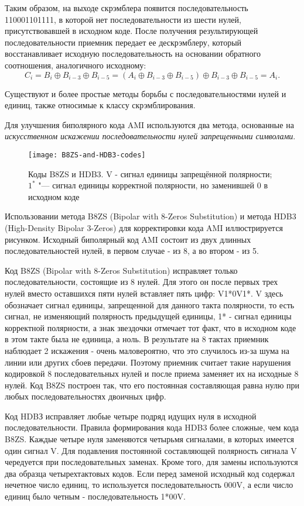 Таким образом, на выходе скрэмблера появится последовательность 110001101111, в которой нет последовательности из шести нулей, присутствовавшей в исходном коде.
После получения результирующей последовательности приемник передает ее дескрэмблеру, который восстанавливает исходную последовательность на основании обратного соотношения, аналогичного исходному:
\[
    C_i = B_i \oplus B_{i-3} \oplus B_{i-5} = (A_i \oplus B_{i-3} \oplus B_{i-5}) \oplus B_{i-3} \oplus B_{i-5} = A_i.
\]

Существуют и более простые методы борьбы с последовательностями нулей и единиц, также относимые к классу скрэмблирования.

Для улучшения биполярного кода AMI используются два метода, основанные на \emph{искусственном искажении последовательности нулей запрещенными символами}.

\begin{figure}[!ht]
    \centering
    \texttt{[image: B8ZS-and-HDB3-codes]}
    \caption{Коды B8ZS и HDB3. V - сигнал единицы запрещённой полярности; $1^*$ "--- сигнал единицы корректной полярности, но заменившей 0 в исходном коде}
    \label{fig:B8ZS-and-HDB3-codes}
\end{figure}

Использовании метода B8ZS (Bipolar with 8-Zeros Substitution) и метода HDB3 (High-Density Bipolar 3-Zeros) для корректировки кода AMI иллюстрируется рисунком.
Исходный биполярный код AMI состоит из двух длинных последовательностей нулей, в первом случае - из 8, а во втором - из 5.

Код B8ZS (Bipolar with 8-Zeros Substitution) исправляет только последовательности, состоящие из 8 нулей.
Для этого он после первых трех нулей вместо оставшихся пяти нулей вставляет пять цифр: V1*0V1*.
V здесь обозначает сигнал единицы, запрещенной для данного такта полярности, то есть сигнал, не изменяющий полярность предыдущей единицы, 1* - сигнал единицы корректной полярности, а знак звездочки отмечает тот факт, что в исходном коде в этом такте была не единица, а ноль.
В результате на 8 тактах приемник наблюдает 2 искажения - очень маловероятно, что это случилось из-за шума на линии или других сбоев передачи.
Поэтому приемник считает такие нарушения кодировкой 8 последовательных нулей и после приема заменяет их на исходные 8 нулей.
Код B8ZS построен так, что его постоянная составляющая равна нулю при любых последовательностях двоичных цифр.

Код HDBЗ исправляет любые четыре подряд идущих нуля в исходной последовательности.
Правила формирования кода HDB3 более сложные, чем кода B8ZS.
Каждые четыре нуля заменяются четырьмя сигналами, в которых имеется один сигнал V.
Для подавления постоянной составляющей полярность сигнала V чередуется при последовательных заменах.
Кроме того, для замены используются два образца четырехтактовых кодов.
Если перед заменой исходный код содержал нечетное число единиц, то используется последовательность 000V, а если число единиц было четным - последовательность 1*00V.

